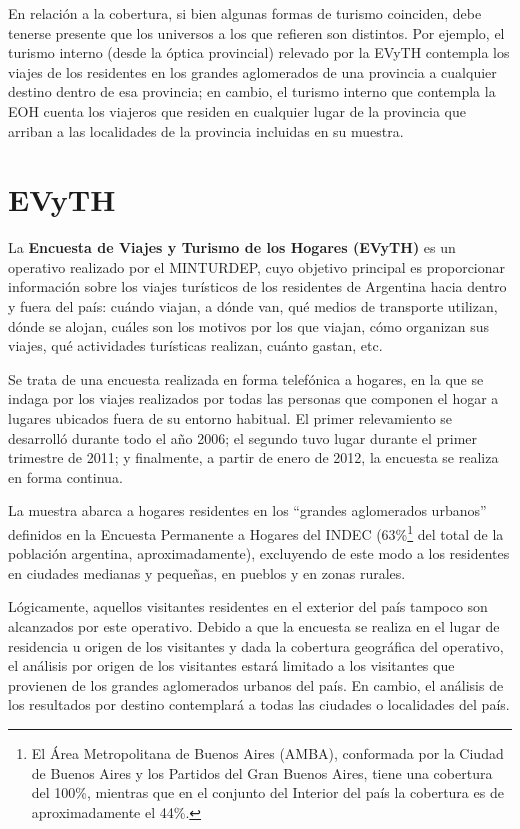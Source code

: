 \documentclass[
  openany]{book}
\begin{document}
En relación a la cobertura, si bien algunas formas de turismo coinciden, debe tenerse presente que los universos a los que refieren son distintos.
Por ejemplo, el turismo interno (desde la óptica provincial) relevado por la EVyTH contempla los viajes de los residentes en los grandes aglomerados de una provincia a cualquier destino dentro de esa provincia; en cambio, el turismo interno que contempla la EOH cuenta los viajeros que residen en cualquier lugar de la provincia que arriban a las localidades de la provincia incluidas en su muestra.

\hypertarget{evyth}{%
\section{EVyTH}\label{evyth}}

La \textbf{Encuesta de Viajes y Turismo de los Hogares (EVyTH)} es un operativo realizado por el MINTURDEP, cuyo objetivo principal es proporcionar información sobre los viajes turísticos de los residentes de Argentina hacia dentro y fuera del país: cuándo viajan, a dónde van, qué medios de transporte utilizan, dónde se alojan, cuáles son los motivos por los que viajan, cómo organizan sus viajes, qué actividades turísticas realizan, cuánto gastan, etc.

Se trata de una encuesta realizada en forma telefónica a hogares, en la que se indaga por los viajes realizados por todas las personas que componen el hogar a lugares ubicados fuera de su entorno habitual.
El primer relevamiento se desarrolló durante todo el año 2006; el segundo tuvo lugar durante el primer trimestre de 2011; y finalmente, a partir de enero de 2012, la encuesta se realiza en forma continua.

La muestra abarca a hogares residentes en los ``grandes aglomerados urbanos'' definidos en la Encuesta Permanente a Hogares del INDEC (63\%\footnote{El Área Metropolitana de Buenos Aires (AMBA), conformada por la Ciudad de Buenos Aires y los Partidos del Gran Buenos Aires, tiene una cobertura del 100\%, mientras que en el conjunto del Interior del país la cobertura es de aproximadamente el 44\%.} del total de la población argentina, aproximadamente), excluyendo de este modo a los residentes en ciudades medianas y pequeñas, en pueblos y en zonas rurales.

Lógicamente, aquellos visitantes residentes en el exterior del país tampoco son alcanzados por este operativo.
Debido a que la encuesta se realiza en el lugar de residencia u origen de los visitantes y dada la cobertura geográfica del operativo, el análisis por origen de los visitantes estará limitado a los visitantes que provienen de los grandes aglomerados urbanos del país.
En cambio, el análisis de los resultados por destino contemplará a todas las ciudades o localidades del país.
\end{document}
